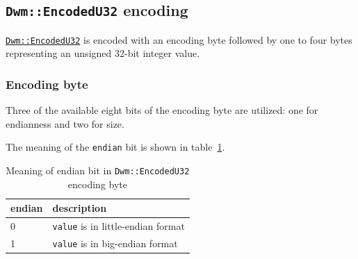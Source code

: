 \begin{minipage}{\textwidth}
\end{minipage}

\begin{minipage}{\textwidth}
\end{minipage}

\begin{minipage}{\textwidth}
\end{minipage}

\subsection{\texttt{Dwm::EncodedU32} encoding}\label{encoding:DwmEncodedU32}
\hyperref[class:EncodedU32]{\texttt{Dwm::EncodedU32}} is encoded with
an encoding byte followed by one to four bytes representing an
unsigned 32-bit integer value.


\subsubsection{Encoding byte}

Three of the available eight bits of the encoding byte are utilized: one
for endianness and two for size.

The meaning of the \texttt{endian} bit is shown in
table~\ref{table:EncodedU32EndianBit}.

\begin{table}[H]
\begin{center}
\begin{tabular}{ll}
  \textbf{endian} & \textbf{description} \\ \hline
  0 & \texttt{value} is in little-endian format \\ \hline
  1 & \texttt{value} is in big-endian format \\
\end{tabular}
\caption{Meaning of endian bit in \texttt{Dwm::EncodedU32} encoding byte}
\label{table:EncodedU32EndianBit}
\end{center}
\end{table}

